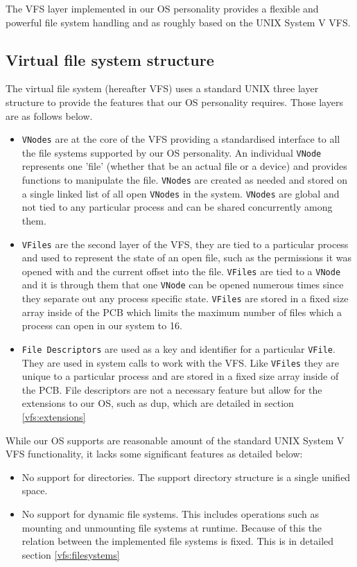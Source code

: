 \documentclass[12pt,english]{article}
\begin{document}
The VFS layer implemented in our OS personality provides a flexible and powerful file system handling and as roughly based on the UNIX System V VFS.

\subsection{Virtual file system structure} \label{vfs:vfs_struct}

The virtual file system (hereafter VFS) uses a standard UNIX three layer structure to provide the features that our OS personality requires. Those layers are as follows below.

\begin{itemize}
\item \texttt{VNodes} are at the core of the VFS providing a standardised interface to all the file systems supported by our OS personality. An individual \texttt{VNode} represents one 'file' (whether that be an actual file or a device) and provides functions to manipulate the file. \texttt{VNodes} are created as needed and stored on a single linked list of all open \texttt{VNodes} in the system. \texttt{VNodes} are global and not tied to any particular process and can be shared concurrently among them.
\item \texttt{VFiles} are the second layer of the VFS, they are tied to a particular process and used to represent the state of an open file, such as the permissions it was opened with and the current offset into the file. \texttt{VFiles} are tied to a \texttt{VNode} and it is through them that one \texttt{VNode} can be opened numerous times since they separate out any process specific state. \texttt{VFiles} are stored in a fixed size array inside of the PCB which limits the maximum number of files which a process can open in our system to 16.
\item \texttt{File Descriptors} are used as a key and identifier for a particular \texttt{VFile}. They are used in system calls to work with the VFS. Like \texttt{VFiles} they are unique to a particular process and are stored in a fixed size array inside of the PCB. File descriptors are not a necessary feature but allow for the extensions to our OS, such as dup, which are detailed in section \ref{vfs:extensions}
\end{itemize}

While our OS supports are reasonable amount of the standard UNIX System V VFS functionality, it lacks some significant features as detailed below:
\begin{itemize}
\item No support for directories. The support directory structure is a single unified space.
\item No support for dynamic file systems. This includes operations such as mounting and unmounting file systems at runtime. Because of this the relation between the implemented file systems is fixed. This is in detailed section \ref{vfs:filesystems}
\end{itemize}
\end{document}
